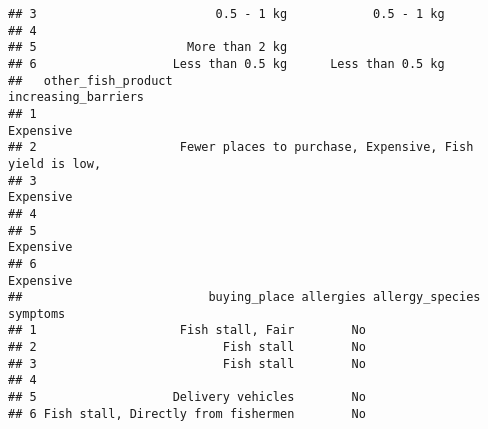 \documentclass[
]{article}
\begin{document}
\begin{verbatim}
## 3                         0.5 - 1 kg            0.5 - 1 kg                
## 4                                                                         
## 5                     More than 2 kg                                      
## 6                   Less than 0.5 kg      Less than 0.5 kg                
##   other_fish_product                                      increasing_barriers
## 1                                                                   Expensive
## 2                    Fewer places to purchase, Expensive, Fish yield is low, 
## 3                                                                   Expensive
## 4                                                                            
## 5                                                                   Expensive
## 6                                                                   Expensive
##                          buying_place allergies allergy_species symptoms
## 1                    Fish stall, Fair        No                         
## 2                          Fish stall        No                         
## 3                          Fish stall        No                         
## 4                                                                       
## 5                   Delivery vehicles        No                         
## 6 Fish stall, Directly from fishermen        No
\end{verbatim}
\end{document}
